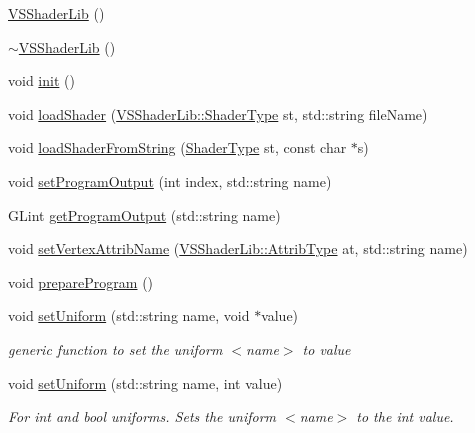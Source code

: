 \begin{DoxyCompactItemize}
\item 
\hyperlink{class_v_s_shader_lib_ab21764358bc78b36b46985acc269f1f8}{V\+S\+Shader\+Lib} ()
\item 
\hyperlink{class_v_s_shader_lib_a6353bc0119a5b0a3a3f68d1880aa1688}{$\sim$\+V\+S\+Shader\+Lib} ()
\item 
void \hyperlink{class_v_s_shader_lib_ad505b7bf7748f8ef6089b4f9d5c516b1}{init} ()
\item 
void \hyperlink{class_v_s_shader_lib_ab83a3a93954f8c8b02363e3975e306ef}{load\+Shader} (\hyperlink{class_v_s_shader_lib_ae8a4410569faa6d4df9760e998a9706a}{V\+S\+Shader\+Lib\+::\+Shader\+Type} st, std\+::string file\+Name)
\item 
void \hyperlink{class_v_s_shader_lib_ae08e31c02a625d9c1c82bd77797a62d7}{load\+Shader\+From\+String} (\hyperlink{class_v_s_shader_lib_ae8a4410569faa6d4df9760e998a9706a}{Shader\+Type} st, const char $\ast$s)
\item 
void \hyperlink{class_v_s_shader_lib_a6e2ba341bb680d14e39b632bace85bd3}{set\+Program\+Output} (int index, std\+::string name)
\item 
G\+Lint \hyperlink{class_v_s_shader_lib_ae13982d7353dfb94442286d2dcac532f}{get\+Program\+Output} (std\+::string name)
\item 
void \hyperlink{class_v_s_shader_lib_a94ab5e49d1e850f28c3a466f90a5be40}{set\+Vertex\+Attrib\+Name} (\hyperlink{class_v_s_shader_lib_ac4141d01d0c856c9ca456e51afd9a2c5}{V\+S\+Shader\+Lib\+::\+Attrib\+Type} at, std\+::string name)
\item 
void \hyperlink{class_v_s_shader_lib_ae320649bc8d42fdadaedc115bd60e671}{prepare\+Program} ()
\item 
void \hyperlink{class_v_s_shader_lib_a8126bd520baadedd4d892a30c4efa9da}{set\+Uniform} (std\+::string name, void $\ast$value)
\begin{DoxyCompactList}\small\item\em generic function to set the uniform $<$name$>$ to value \end{DoxyCompactList}\item 
void \hyperlink{class_v_s_shader_lib_a6d0aa9cc7add41f1d6f30d29efbea0ec}{set\+Uniform} (std\+::string name, int value)
\begin{DoxyCompactList}\small\item\em For int and bool uniforms. Sets the uniform $<$name$>$ to the int value. \end{DoxyCompactList}\item 

\end{DoxyCompactItemize}
